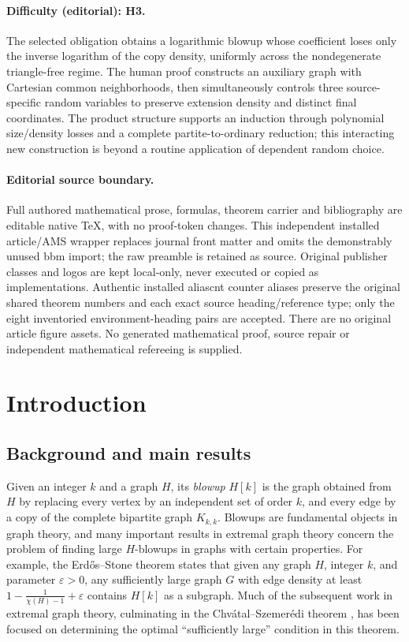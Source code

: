 \documentclass[11pt]{article}
\numberwithin{equation}{section}
\theoremstyle{plain}
\theoremstyle{remark}
\begin{document}
\paragraph{Difficulty (editorial): H3.} The selected obligation obtains a logarithmic blowup whose coefficient loses only the inverse logarithm of the copy density, uniformly across the nondegenerate triangle-free regime. The human proof constructs an auxiliary graph with Cartesian common neighborhoods, then simultaneously controls three source-specific random variables to preserve extension density and distinct final coordinates. The product structure supports an induction through polynomial size/density losses and a complete partite-to-ordinary reduction; this interacting new construction is beyond a routine application of dependent random choice.
\paragraph{Editorial source boundary.} Full authored mathematical prose, formulas, theorem carrier and bibliography are editable native TeX, with no proof-token changes. This independent installed article/AMS wrapper replaces journal front matter and omits the demonstrably unused bbm import; the raw preamble is retained as source. Original publisher classes and logos are kept local-only, never executed or copied as implementations. Authentic installed aliascnt counter aliases preserve the original shared theorem numbers and each exact source heading/reference type; only the eight inventoried environment-heading pairs are accepted. There are no original article figure assets. No generated mathematical proof, source repair or independent mathematical refereeing is supplied.
\clearpage
\section{Introduction}
\subsection{Background and main results}
Given an integer $k$ and a graph $H$, its \emph{blowup} $H[k]$ is the graph obtained from $H$ by replacing every vertex by an independent set of order $k$, and every edge by a copy of the complete bipartite graph $K_{k,k}$. Blowups are fundamental objects in graph theory, and many important results in extremal graph theory concern the problem of finding large $H$-blowups in graphs with certain properties. For example, the Erd\H os--Stone theorem \cite{MR0018807} states that given any graph $H$, integer $k$, and parameter $\varepsilon>0$, any sufficiently large graph $G$ with edge density at least $1-\frac{1}{\chi(H)-1}+\varepsilon$ contains $H[k]$ as a subgraph. Much of the subsequent work in extremal graph theory, culminating in the Chv\'atal--Szemer\'edi theorem \cite{MR0609100}, has been focused on determining the optimal ``sufficiently large'' condition in this theorem.
\end{document}
